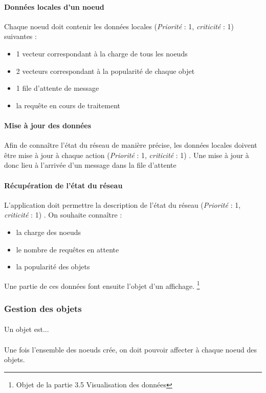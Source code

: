 \documentclass[12pt]{article}
\newcommand{\besoin}[2] {
  (\textit{Priorité} : #1, \textit{criticité} : #2)
}
\begin{document}
\paragraph{Données locales d'un noeud} Chaque noeud doit contenir les données locales \besoin{1}{1} suivantes :
\begin{itemize}
 \item 1 vecteur correspondant à la charge de tous les noeuds
 \item 2 vecteurs  correspondant à la popularité de chaque objet
 \item 1 file d'attente de message
 \item la requête en cours de traitement
\end{itemize}

\paragraph{Mise à jour des données} Afin de connaître l'état du réseau de manière précise, les données locales doivent être mise à jour à chaque action \besoin{1}{1}.
Une mise à jour à donc lieu à l'arrivée d'un message dans la file d'attente

\paragraph{Récupération de l'état du réseau} L'application doit permettre la description de l'état du réseau \besoin{1}{1}.
On souhaite connaître : 
\begin{itemize}
 \item la charge des noeuds
 \item le nombre de requêtes en attente
 \item la popularité des objets
\end{itemize}
Une partie de ces données font ensuite l'objet d'un affichage. \footnote{Objet de la partie 3.5 Visualisation des données}

 
\subsubsection{Gestion des objets}

\paragraph{} Un objet est...

\paragraph{} Une fois l'ensemble des noeuds crée, on doit pouvoir affecter à chaque noeud des objets.
\end{document}
